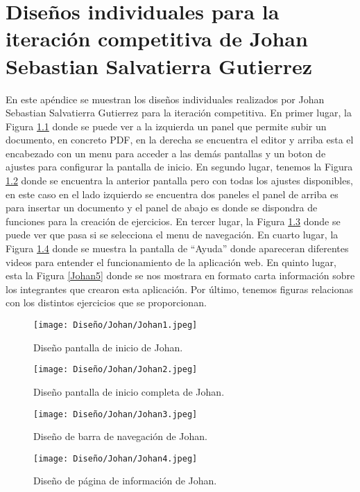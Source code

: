 \chapter{Diseños individuales para la iteración competitiva de Johan Sebastian Salvatierra Gutierrez}
\label{ape:disenyoJohan}

En este apéndice se muestran los diseños individuales realizados por Johan Sebastian Salvatierra Gutierrez para la iteración competitiva. En primer lugar, la Figura \ref{Johan1} donde se puede ver a la izquierda un panel que permite subir un documento, en concreto PDF, en la derecha se encuentra el editor y arriba esta el encabezado con un menu para acceder a las demás pantallas y un boton de ajustes para configurar la pantalla de inicio. En segundo lugar, tenemos la Figura \ref{Johan2} donde se encuentra la anterior pantalla pero con todas los ajustes disponibles, en este caso en el lado izquierdo se encuentra dos paneles el panel de arriba es para insertar un documento y el panel de abajo es donde se dispondra de funciones para la creación de ejercicios. En tercer lugar, la Figura \ref{Johan3} donde se puede ver que pasa si se selecciona el menu de navegación. En cuarto lugar, la Figura \ref{Johan4} donde se muestra la pantalla de ``Ayuda'' donde apareceran diferentes videos para entender el funcionamiento de la aplicación web. En quinto lugar, esta la Figura \ref{Johan5} donde se nos mostrara en formato carta información sobre los integrantes que crearon esta aplicación. Por último, tenemos figuras relacionas con los distintos ejercicios que se proporcionan.

\begin{figure}[ht!]
  \centering
  \texttt{[image: Diseño/Johan/Johan1.jpeg]}
  \caption{Diseño pantalla de inicio de Johan.}
  \label{Johan1}
\end{figure}

\begin{figure}[ht!]
  \centering
  \texttt{[image: Diseño/Johan/Johan2.jpeg]}
  \caption{Diseño pantalla de inicio completa de Johan.}
  \label{Johan2}
\end{figure}

\begin{figure}[ht!]
  \centering
  \texttt{[image: Diseño/Johan/Johan3.jpeg]}
  \caption{Diseño de barra de navegación de Johan.}
  \label{Johan3}
\end{figure}

\begin{figure}[ht!]
  \centering
  \texttt{[image: Diseño/Johan/Johan4.jpeg]}
  \caption{Diseño de página de información de Johan.}
  \label{Johan4}
\end{figure}

